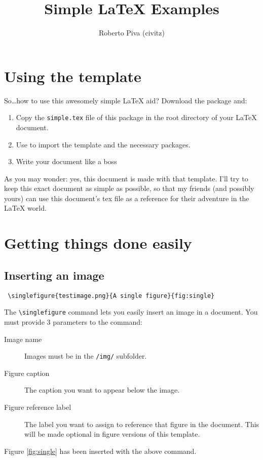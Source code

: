 

\title{Simple \LaTeX{} Examples}
\author{Roberto Piva (civitz)}


\maketitle

\tableofcontents

\section{Using the template}
So\dots how to use this awesomely simple \LaTeX{} aid? Download the package and:
\begin{enumerate}
 \item Copy the \verb!simple.tex! file of this package in the root directory of your \LaTeX{} document. 
 \item Use \verb!! to import the template and the necessary packages.
 \item Write your document like a boss
\end{enumerate}
As you may wonder: yes, this document is made with that template. 
I'll try to keep this exact document as simple as possible, so that my friends (and possibly yours) 
can use this document's tex file as a reference for their adventure in the \LaTeX{} world.
\section{Getting things done easily}
\label{sec:gtde}
\subsection{Inserting an image}
\begin{verbatim}
 \singlefigure{testimage.png}{A single figure}{fig:single}
\end{verbatim}
The \verb!\singlefigure! command lets you easily insert an image in a document.
You must provide 3 parameters to the command: 
\begin{description}
 \item[Image name] 
    Images must be in the \verb!/img/! subfolder.
 \item[Figure caption] 
    The caption you want to appear below the image.
 \item[Figure reference label] 
    The label you want to assign to reference that figure in the document. 
    This will be made optional in figure versions of this template.
\end{description}
Figure \ref{fig:single} has been inserted with the above command.

